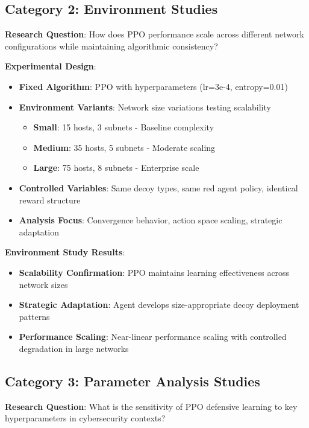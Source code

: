 \documentclass[12pt,oneside]{article}
\begin{document}
\subsection{Category 2: Environment Studies}

\textbf{Research Question}: How does PPO performance scale across different network configurations while maintaining algorithmic consistency?

\textbf{Experimental Design}:
\begin{itemize}
\item \textbf{Fixed Algorithm}: PPO with hyperparameters (lr=3e-4, entropy=0.01)
\item \textbf{Environment Variants}: Network size variations testing scalability
  \begin{itemize}
    \item \textbf{Small}: 15 hosts, 3 subnets - Baseline complexity
    \item \textbf{Medium}: 35 hosts, 5 subnets - Moderate scaling
    \item \textbf{Large}: 75 hosts, 8 subnets - Enterprise scale
  \end{itemize}
\item \textbf{Controlled Variables}: Same decoy types, same red agent policy, identical reward structure
\item \textbf{Analysis Focus}: Convergence behavior, action space scaling, strategic adaptation
\end{itemize}

\textbf{Environment Study Results}:
\begin{itemize}
\item \textbf{Scalability Confirmation}: PPO maintains learning effectiveness across network sizes
\item \textbf{Strategic Adaptation}: Agent develops size-appropriate decoy deployment patterns
\item \textbf{Performance Scaling}: Near-linear performance scaling with controlled degradation in large networks
\end{itemize}

\subsection{Category 3: Parameter Analysis Studies}

\textbf{Research Question}: What is the sensitivity of PPO defensive learning to key hyperparameters in cybersecurity contexts?
\end{document}
